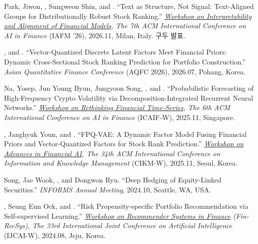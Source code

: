 \documentclass[11pt]{article}
\renewcommand{\corr}{{\footnotesize (\cvmark{*}: 교신저자)}}
\begin{document}
\begin{nlist}
\item[{[6]}] Park, Jiwon\cvmark{\textdagger}, \me\cvmark{\textdagger}, Sungweon Shin, and \song. ``Text as Structure, Not Signal: Text-Aligned Groups for Distributionally Robust Stock Ranking.'' \textit{\href{https://iafm-icaif.netlify.app/}{Workshop on Interpretability and Alignment of Financial Models}, The 7th ACM International Conference on AI in Finance} (IAFM '26), 2026.11, Milan, Italy. 구두 발표.
\item[{[5]}] \mefirst, and \song. ``Vector-Quantized Discrete Latent Factors Meet Financial Priors: Dynamic Cross-Sectional Stock Ranking Prediction for Portfolio Construction.'' \textit{Asian Quantitative Finance Conference} (AQFC 2026), 2026.07, Pohang, Korea.
\item[{[4]}] Na, Yosep, Jun Young Byun, Jungyoon Song, \me, and \song. ``Probabilistic Forecasting of High-Frequency Crypto Volatility via Decomposition-Integrated Recurrent Neural Networks.'' \textit{\href{https://icaif25-rfts.github.io/}{Workshop on Rethinking Financial Time-Series}, The 6th ACM International Conference on AI in Finance} (ICAIF-W), 2025.11, Singapore.
\item[{[3]}] \mefirst, Janghyuk Youn, and \song. ``FPQ-VAE: A Dynamic Factor Model Fusing Financial Priors and Vector-Quantized Factors for Stock Rank Prediction.'' \textit{\href{https://advancesinfinancialai.com/}{Workshop on Advances in Financial AI}, The 34th ACM International Conference on Information and Knowledge Management} (CIKM-W), 2025.11, Seoul, Korea.
\item[{[2]}] Song, Jae Wook\cvmark{*}, \me, and Dongwon Ryu. ``Deep Hedging of Equity-Linked Securities.'' \textit{INFORMS Annual Meeting}, 2024.10, Seattle, WA, USA.
\item[{[1]}] \mefirst, Seung Eun Ock, and \song. ``Risk Propensity-specific Portfolio Recommendation via Self-supervised Learning.'' \textit{\href{https://sites.google.com/view/fin-recsys2024/program}{Workshop on Recommender Systems in Finance} (Fin-RecSys), The 33rd International Joint Conference on Artificial Intelligence} (IJCAI-W), 2024.08, Jeju, Korea.
\end{nlist}
\cvsub[\corr]{국내 학술대회}
\end{document}
